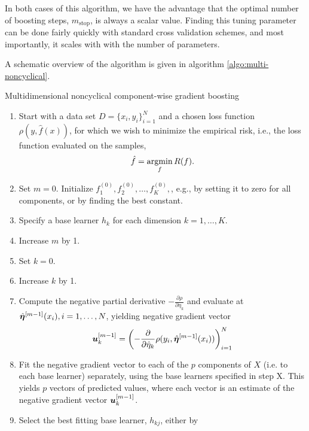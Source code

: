 In both cases of this algorithm, we have the advantage that the optimal number of boosting steps, $m_{\text{stop}}$, is always a scalar value.
Finding this tuning parameter can be done fairly quickly with standard cross validation schemes, and most importantly, it scales with with the number of parameters.

A schematic overview of the algorithm is given in algorithm \ref{algo:multi-noncyclical}.

\begin{algorithm}
\caption{Multidimensional noncyclical component-wise gradient boosting}
\label{algo:multi-noncyclical}
\begin{enumerate}
    \item Start with a data set $D=\{x_i, y_i\}_{i=1}^N$ and a chosen loss function $\rho(y,\hat{f}(x))$, for which we wish to
        minimize the empirical risk, i.e., the loss function evaluated on the samples,
        \begin{equation}
            \hat{f}=\operatorname*{argmin}_{f}R(f).
        \end{equation}
    \item Set $m=0$. Initialize $f^{(0)}_1,f^{(0)}_2,\ldots,f^{(0)}_K,$, e.g., by setting it to zero for all components, or by finding the best constant.%
    \item Specify a base learner $h_k$ for each dimension $k=1,\ldots,K$.
    \item Increase $m$ by 1.
    \item Set $k=0$.
    \item Increase $k$ by 1.
    \item Compute the negative partial derivative $-\frac{\partial\rho}{\partial \eta_k}$
        and evaluate at $\hat{\boldsymbol{\eta}}^{[m-1]}(x_i),i=1,\ldots,N$, yielding negative gradient vector
        \begin{equation}
            \bm{u}^{[m-1]}_k=\left(-\frac{\partial}{\partial \hat{\eta}_k}\rho(y_i, \hat{\boldsymbol{\eta}}^{[m-1]}(x_i))\right)_{i=1}^N
        \end{equation}
    \item Fit the negative gradient vector to each of the $p$ components of $X$ (i.e. to each base learner) separately, using the base learners specified in step X. This yields $p$ vectors of predicted values, where each vector is an estimate of the negative gradient vector $\bm{u}^{[m-1]}_k$.
    \item Select the best fitting base learner, $h_{kj}$, either by
        \begin{itemize}

\end{itemize}
\end{enumerate}
\end{algorithm}
